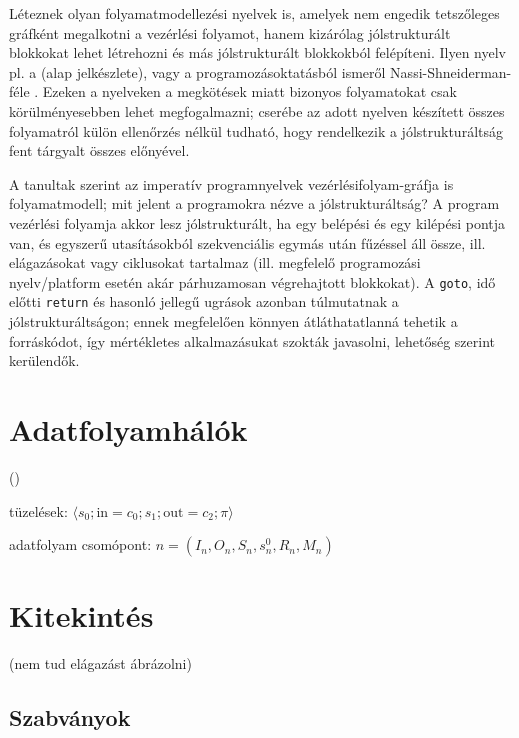Léteznek olyan folyamatmodellezési nyelvek is, amelyek nem engedik tetszőleges gráfként megalkotni a vezérlési folyamot, hanem kizárólag jólstrukturált blokkokat lehet létrehozni és más jólstrukturált blokkokból felépíteni. Ilyen nyelv pl. a  (alap jelkészlete), vagy a programozásoktatásból ismeről Nassi-Shneiderman-féle . Ezeken a nyelveken a megkötések miatt bizonyos folyamatokat csak körülményesebben lehet megfogalmazni; cserébe az adott nyelven készített összes folyamatról külön ellenőrzés nélkül tudható, hogy rendelkezik a jólstrukturáltság fent tárgyalt összes előnyével.

A tanultak szerint az imperatív programnyelvek vezérlésifolyam-gráfja is folyamatmodell; mit jelent a programokra nézve a jólstrukturáltság? A program vezérlési folyamja akkor lesz jólstrukturált, ha egy belépési és egy kilépési pontja van, és egyszerű utasításokból szekvenciális egymás után fűzéssel áll össze, ill. elágazásokat vagy ciklusokat tartalmaz (ill. megfelelő programozási nyelv/platform esetén akár párhuzamosan végrehajtott blokkokat). A \lstinline{goto}, idő előtti \lstinline{return} és hasonló jellegű ugrások azonban túlmutatnak a jólstrukturáltságon; ennek megfelelően könnyen átláthatatlanná tehetik a forráskódot, így mértékletes alkalmazásukat szokták javasolni, lehetőség szerint kerülendők.

\section{Adatfolyamhálók}

 


 ()

\newcommand{\prioritas}{\pi}
\newcommand{\tuple}[1]{\langle #1 \rangle}

tüzelések: $\tuple{s_0; \mathrm{in} = c_0; s_1; \mathrm{out} = c_2; \prioritas}$

adatfolyam csomópont: $n = (I_n, O_n, S_n, s_n^0, R_n, M_n)$

\section{Kitekintés\kieg}


 (nem tud elágazást ábrázolni)

\subsection{Szabványok}

